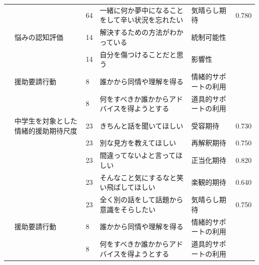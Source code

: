 \begin{landscape}
\begin{longtable}{p{2cm}p{2cm}p{2cm}p{6cm}p{2cm}p{2cm}}
                                 &                                  & 64  & 一緒に何か夢中になることをして辛い状況を忘れたい                            & 気晴らし期待               & 0.780   \\
                                 & 悩みの認知評価                          & 14  & 解決するための方法がわかっている                                    & 統制可能性                &         \\
                                 &                                  & 14  & 自分を傷つけることだと思う                                       & 影響性                  &         \\
                                 & 援助要請行動                           & 8   & 誰かから同情や理解を得る                                        & 情緒的サポートの利用           &         \\
                                 &                                  & 8   & 何をすべきか誰かからアドバイスを得ようとする                              & 道具的サポートの利用           &         \\
                                 & 中学生を対象とした情緒的援助期待尺度               & 23  & きちんと話を聞いてほしい                                        & 受容期待                 & 0.730   \\
                                 &                                  & 23  & 別な見方を教えてほしい                                         & 再解釈期待                & 0.750   \\
                                 &                                  & 23  & 間違ってないよと言ってほしい                                      & 正当化期待                & 0.820   \\
                                 &                                  & 23  & そんなこと気にするなと笑い飛ばしてほしい                                & 楽観的期待                & 0.640   \\
                                 &                                  & 23  & 全く別の話をして話題から意識をそらしたい                                & 気晴らし期待               & 0.750   \\
                                 & 援助要請行動                           & 8   & 誰かから同情や理解を得る                                        & 情緒的サポートの利用           &         \\
                                 &                                  & 8   & 何をすべきか誰かからアドバイスを得ようとする                              & 道具的サポートの利用           &         \\

\end{longtable}
\end{landscape}
